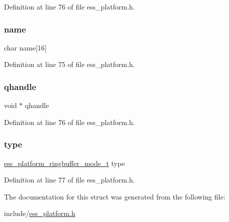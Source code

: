Definition at line 76 of file ess\+\_\+platform.\+h.

\mbox{\label{structess__platform__ringbuffer_acd328517a6cf718155c2e6e22b671ca9}} 
\subsubsection{\texorpdfstring{name}{name}}
{\footnotesize\ttfamily char name\mbox{[}16\mbox{]}}



Definition at line 75 of file ess\+\_\+platform.\+h.

\mbox{\label{structess__platform__ringbuffer_a011a9cee6c81e61319318a9a5776db28}} 
\subsubsection{\texorpdfstring{qhandle}{qhandle}}
{\footnotesize\ttfamily void $\ast$ qhandle}



Definition at line 76 of file ess\+\_\+platform.\+h.

\mbox{\label{structess__platform__ringbuffer_a6d72e7e7d09fd9b2363d51f2e6c408f5}} 
\subsubsection{\texorpdfstring{type}{type}}
{\footnotesize\ttfamily \hyperlink{ess__platform_8h_a80a1652a42f77e9a51f3e45c7da84396}{ess\+\_\+platform\+\_\+ringbuffer\+\_\+mode\+\_\+t} type}



Definition at line 77 of file ess\+\_\+platform.\+h.



The documentation for this struct was generated from the following file\+:\begin{DoxyCompactItemize}
\item 
include/\hyperlink{ess__platform_8h}{ess\+\_\+platform.\+h}\end{DoxyCompactItemize}
